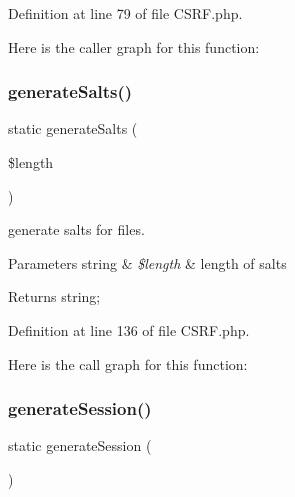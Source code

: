 Definition at line 79 of file C\+S\+R\+F.\+php.

Here is the caller graph for this function\+:
\mbox{\label{class_zest_1_1_c_s_r_f_1_1_c_s_r_f_a991cb545814a29d8593b1c46c2a8648f}} 
\subsubsection{\texorpdfstring{generate\+Salts()}{generateSalts()}}
{\footnotesize\ttfamily static generate\+Salts (\begin{DoxyParamCaption}\item[{}]{\$length }\end{DoxyParamCaption})\hspace{0.3cm}{\ttfamily [static]}}

generate salts for files.


\begin{DoxyParams}[1]{Parameters}
string & {\em \$length} & length of salts\\
\hline
\end{DoxyParams}
\begin{DoxyReturn}{Returns}
string; 
\end{DoxyReturn}


Definition at line 136 of file C\+S\+R\+F.\+php.

Here is the call graph for this function\+:
\mbox{\label{class_zest_1_1_c_s_r_f_1_1_c_s_r_f_a45ff5e99e50937cf210eabc7f3919584}} 
\subsubsection{\texorpdfstring{generate\+Session()}{generateSession()}}
{\footnotesize\ttfamily static generate\+Session (\begin{DoxyParamCaption}{ }\end{DoxyParamCaption})\hspace{0.3cm}{\ttfamily [static]}}

